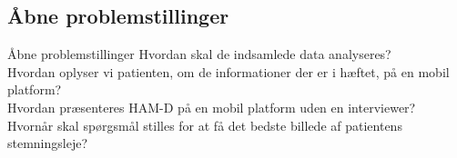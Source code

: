 \subsection{Åbne problemstillinger}
\begin{frame}{Åbne problemstillinger}
Hvordan skal de indsamlede data analyseres?\\
Hvordan oplyser vi patienten, om de informationer der er i hæftet, på en mobil platform?\\
Hvordan præsenteres HAM-D på en mobil platform uden en interviewer?\\
Hvornår skal spørgsmål stilles for at få det bedste billede af patientens stemningsleje?\\

\end{frame}
